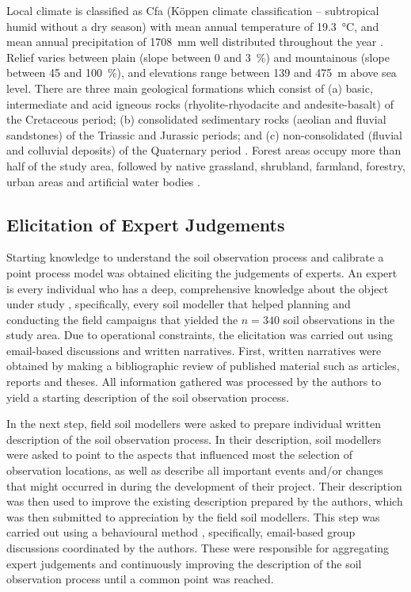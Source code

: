 Local climate is classified as Cfa (K{\"o}ppen climate classification -- subtropical humid without a dry 
season) with mean annual temperature of \SI{19.3}{\celsius}, and mean annual precipitation of \SI{1708}{\mm} 
well distributed throughout the year \cite{Maluf2000}. Relief varies between plain (slope between \num{0} and 
\SI{3}{\percent}) and mountainous (slope between \num{45} and \SI{100}{\percent}), and elevations range 
between \num{139} and \SI{475}{\m} above sea level. There are three main geological formations which consist 
of (a) basic, intermediate and acid igneous rocks (rhyolite-rhyodacite and andesite-basalt) of the Cretaceous 
period; (b) consolidated sedimentary rocks (aeolian and fluvial sandstones) of the Triassic and Jurassic 
periods; and (c) non-consolidated (fluvial and colluvial deposits) of the Quaternary period 
\cite{GasparettoEtAl1988, MacielFilho1990, Sartori2009}. Forest areas occupy more than half of the study area, 
followed by native grassland, shrubland, farmland, forestry, urban areas and artificial water bodies 
\cite{SamuelRosaEtAl2011a}.

\subsection{Elicitation of Expert Judgements}

Starting knowledge to understand the soil observation process and calibrate a point process model was 
obtained eliciting the judgements of experts. An expert is every individual who has a deep, comprehensive 
knowledge about the object under study \cite{MeyerEtAl2001}, specifically, every soil modeller that helped 
planning and conducting the field campaigns that yielded the $n = 340$ soil observations in the study area. 
Due to operational constraints, the elicitation was carried out using email-based discussions and written 
narratives. First, written narratives were obtained by making a bibliographic review of published material 
such as articles, reports and theses. All information gathered was processed by the authors to yield a 
starting description of the soil observation process.

In the next step, field soil modellers were asked to prepare individual written description of the soil 
observation process. In their description, soil modellers were asked to point to the aspects that influenced 
most the selection of observation locations, as well as describe all important events and/or changes that 
might occurred in during the development of their project. Their description was then used to improve the 
existing description prepared by the authors, which was then submitted to appreciation by the field soil 
modellers. This step was carried out using a behavioural method \cite{OrsiEtAl2011}, specifically, email-based 
group discussions coordinated by the authors. These were responsible for aggregating expert judgements and 
continuously improving the description of the soil observation process until a common point was reached.

